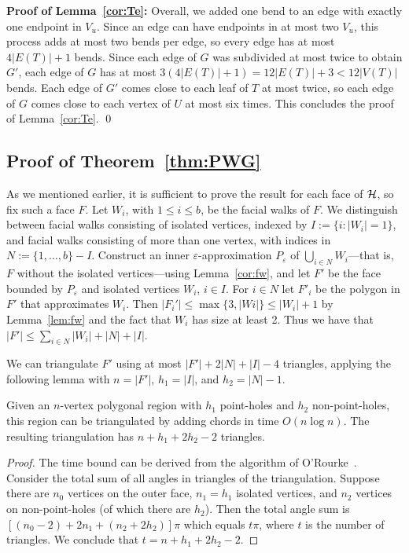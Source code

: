 \documentclass{llncs}
\newenvironment{proofof}[1]{\par\addvspace\topsep\noindent
{\bf Proof #1:} \ignorespaces }{\qed}
\begin{document}
\begin{proofof}{of Lemma~\ref{cor:Te}}
Overall, we added one bend to an edge with exactly one endpoint in $V_u$. Since an edge can have endpoints in at most two $V_u$, this process adds at most two bends per edge, so every edge has at most $4|E(T)|+1$ bends. Since each edge of $G$ was subdivided at most twice to obtain $G'$, each edge of $G$ has at most $3 (4|E(T)|+1) = 12 |E(T)| + 3 < 12 |V(T)|$ bends. Each edge of $G'$ comes close to each leaf of $T$ at most twice, so each edge of $G$ comes close to each vertex of $U$ at most six times. This concludes the proof of Lemma~\ref{cor:Te}.
\end{proofof}

\subsection{Proof of Theorem~\ref{thm:PWG}}\label{sec:PPWG}

As we mentioned earlier, it is sufficient to prove the result for each face of ${\cal H}$, so fix such a face $F$.
Let $W_i$, with $1 \leq i \leq b$, be the facial walks of $F$. We distinguish between facial walks consisting of isolated vertices, indexed by $I := \{i: |W_i| = 1\}$, and facial walks consisting of more than one vertex, with indices in $N := \{1, \ldots, b\} - I$.
Construct an inner $\varepsilon$-approximation $P_{\varepsilon}$ of $\bigcup_{i \in N} W_i$---that is, $F$ without the isolated vertices---using Lemma~\ref{cor:fw}, and let $F'$ be the face bounded by $P_{\varepsilon}$ and isolated vertices $W_i$, $i \in I$.
For $i \in N$ let $F'_i$ be the polygon in $F'$ that approximates $W_i$.
Then
$|F_i'| \le \max\{3,|Wi|\} \le |W_i| + 1$ by Lemma~\ref{lem:fw} and the fact that $W_i$ has size at least 2.
Thus we have that $|F'| \leq \sum_{i\in N} |W_i| + |N| + |I|$.




We can triangulate $F'$ using at most $|F'| + 2|N| + |I| -4$ triangles, applying the following lemma with $n=|F'|$, $h_1=|I|$, and $h_2=|N|-1$.

\begin{lemma}\label{le:number-of-triangles}
Given an $n$-vertex polygonal region with $h_1$ point-holes and $h_2$ non-point-holes, this region can be triangulated by adding chords in time $O(n \log n)$. The resulting triangulation has $n+h_1 + 2h_2 -2$ triangles.
\end{lemma}

\begin{proof}
The time bound can be derived from the algorithm of O'Rourke~\cite[Lemma 5.1]{OR87}. Consider the total sum of all angles in triangles of the triangulation. Suppose there are $n_0$ vertices on the outer face, $n_1 = h_1$ isolated vertices, and $n_2$ vertices on non-point-holes (of which there are $h_2$). Then the total angle sum is $[(n_0-2) + 2n_1 + (n_2 + 2h_2)]\pi$ which equals $t\pi$, where $t$ is the number of triangles. We conclude that $t =  n + h_1 + 2h_2-2$.
\end{proof}
\end{document}
